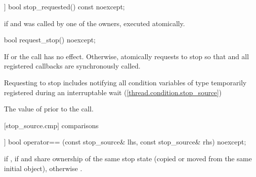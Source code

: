{%
\begin{itemdecl}
[[nodiscard]] bool stop_requested() const noexcept;
\end{itemdecl}
\begin{itemdescr}
  \pnum\returns {} if  
                and  was called by one of the owners, executed atomically.
\end{itemdescr}

%
\begin{itemdecl}
bool request_stop() noexcept;
\end{itemdecl}
\begin{itemdescr}

  \pnum\effects If  or  the call has no effect. 
                Otherwise, atomically requests to stop so that 
                and all registered callbacks are synchronously called.
                \begin{note} Requesting to stop includes notifying all condition variables
                             of type 
                             temporarily registered during an interruptable wait (\ref{thread.condition.stop_source})
                             \end{note}

  \pnum\postconditions {}

  \pnum\returns The value of  prior to the call.
\end{itemdescr}


[stop_source.cmp]{ comparisons}

%
\begin{itemdecl}
[[nodiscard]] bool operator== (const stop_source& lhs, const stop_source& rhs) noexcept;
\end{itemdecl}
\begin{itemdescr}
  \pnum\returns {} if ,
                 if  and  share ownership
                of the same stop state
                (copied or moved from the same initial  object),
                otherwise .
\end{itemdescr}

}
